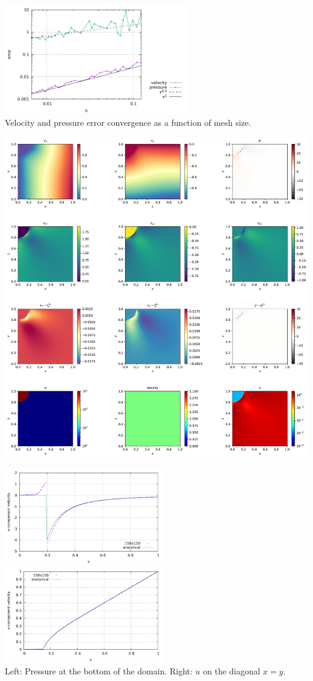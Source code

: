 \begin{center}
\includegraphics[width=8cm]{python_codes/fieldstone_07/results/errors}\\
{\captionfont Velocity and pressure error convergence as a function of mesh size.}
\end{center}

\includegraphics[width=15cm]{python_codes/fieldstone_07/results/solution}

\begin{center}
\includegraphics[width=7cm]{python_codes/fieldstone_07/results/pressbottom}
\includegraphics[width=7cm]{python_codes/fieldstone_07/results/veldiag}\\
{\captionfont Left: Pressure at the bottom of the domain. Right: $u$ on the diagonal $x=y$.}
\end{center}

